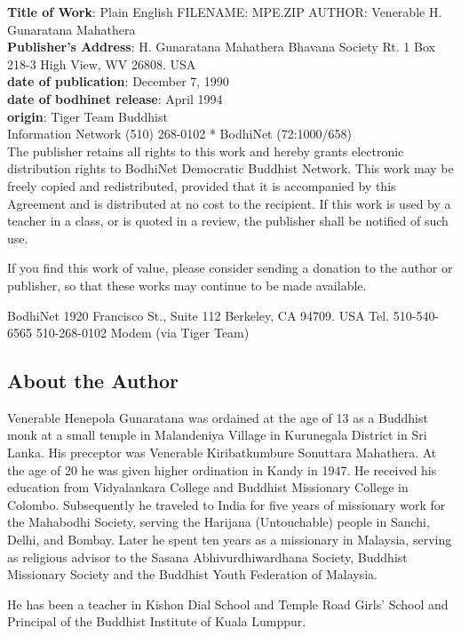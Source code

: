 \textbf{Title of Work}:  Plain English FILENAME: MPE.ZIP AUTHOR: Venerable H. Gunaratana Mahathera\\
\textbf{Publisher's Address}: H. Gunaratana Mahathera Bhavana Society Rt. 1 Box 218-3 High View, WV 26808. USA\\
\textbf{date of publication}: December 7, 1990 \\
\textbf{date of bodhinet release}: April 1994 \\
\textbf{origin}: Tiger Team Buddhist\\
Information Network (510) 268-0102 * BodhiNet (72:1000/658)\\
The publisher retains all rights to this work and hereby grants electronic distribution rights to BodhiNet Democratic Buddhist
Network. This work may be freely copied and redistributed, provided that it is accompanied by this Agreement and is distributed
at no cost to the recipient. If this work is used by a teacher in a class, or is quoted in a review, the publisher shall be notified of
such use.

If you find this work of value, please consider sending a donation to the author or publisher, so that these works may continue to
be made available.

BodhiNet 1920 Francisco St., Suite 112 Berkeley, CA 94709. USA
Tel. 510-540-6565 510-268-0102 Modem (via Tiger Team)

\newpage
\subsection*{About the Author}

Venerable Henepola Gunaratana was ordained at the age of 13 as a Buddhist monk
at a small temple in Malandeniya Village in Kurunegala District in Sri Lanka.
His preceptor was Venerable Kiribatkumbure Sonuttara Mahathera. At the age of 20
he was given higher ordination in Kandy in 1947. He received his education from
Vidyalankara College and Buddhist Missionary College in Colombo. Subsequently he
traveled to India for five years of missionary work for the Mahabodhi Society,
serving the Harijana (Untouchable) people in Sanchi, Delhi, and Bombay. Later he
spent ten years as a missionary in Malaysia, serving as religious advisor to the
Sasana Abhivurdhiwardhana Society, Buddhist Missionary Society and the Buddhist
Youth Federation of Malaysia.

He has been a teacher in Kishon Dial School and Temple Road Girls' School and
Principal of the Buddhist Institute of Kuala Lumppur.

